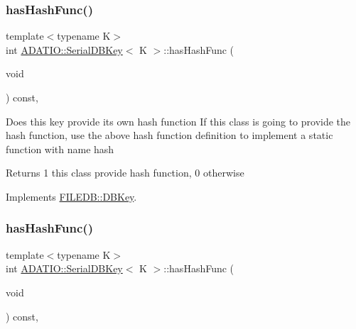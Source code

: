 \subsubsection{\texorpdfstring{hasHashFunc()}{hasHashFunc()}\hspace{0.1cm}{\footnotesize\ttfamily [1/3]}}
{\footnotesize\ttfamily template$<$typename K$>$ \\
int \mbox{\hyperlink{classADATIO_1_1SerialDBKey}{A\+D\+A\+T\+I\+O\+::\+Serial\+D\+B\+Key}}$<$ K $>$\+::has\+Hash\+Func (\begin{DoxyParamCaption}\item[{void}]{ }\end{DoxyParamCaption}) const\hspace{0.3cm}{\ttfamily [inline]}, {\ttfamily [virtual]}}

Does this key provide its own hash function If this class is going to provide the hash function, use the above hash function definition to implement a static function with name hash

\begin{DoxyReturn}{Returns}
1 this class provide hash function, 0 otherwise 
\end{DoxyReturn}


Implements \mbox{\hyperlink{classFILEDB_1_1DBKey_a541dab4f4083ae951dee2f30483eb18e}{F\+I\+L\+E\+D\+B\+::\+D\+B\+Key}}.

\mbox{\label{classADATIO_1_1SerialDBKey_ae8926cd9bdef006f3729f4b724a2e2fe}} 
\subsubsection{\texorpdfstring{hasHashFunc()}{hasHashFunc()}\hspace{0.1cm}{\footnotesize\ttfamily [2/3]}}
{\footnotesize\ttfamily template$<$typename K$>$ \\
int \mbox{\hyperlink{classADATIO_1_1SerialDBKey}{A\+D\+A\+T\+I\+O\+::\+Serial\+D\+B\+Key}}$<$ K $>$\+::has\+Hash\+Func (\begin{DoxyParamCaption}\item[{void}]{ }\end{DoxyParamCaption}) const\hspace{0.3cm}{\ttfamily [inline]}, {\ttfamily [virtual]}}

